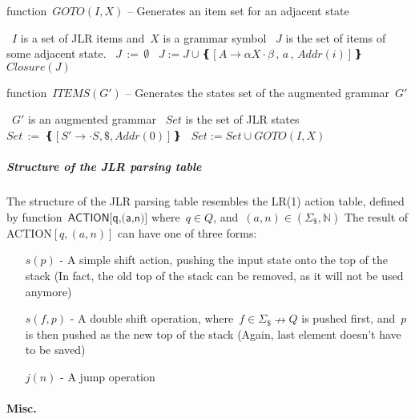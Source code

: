 \begin{algorithm}[p]
  \caption{\label{Algorithm:Goto}
  function~$GOTO(I,X)$ -- Generates an item set for an adjacent state}
  \begin{algorithmic}
    \REQUIRE~$I$ is a set of JLR items and~$X$ is a grammar symbol
    \ENSURE~$J$ is the set of items of some adjacent state.
    \STATE~$J \, := \,∅$
      \STATE~$ J := J∪❴ [ A→αX·β\, , \, a \, , \, Addr(i) ] ❵$
    \ENDFOR
    \RETURN~$Closure(J)$
  \end{algorithmic}
\end{algorithm}

\begin{algorithm}[p]
  \caption{\label{Algorithm:States}
  function~$ITEMS(G')$ -- Generates the states set of the augmented grammar~$G'$}
  \begin{algorithmic}
    \REQUIRE~$G'$ is an augmented grammar
    \ENSURE~$Set$ is the set of JLR states
    \STATE~$Set \, := \, ❴[S'→·S , \$ , Addr(0)]❵$
    \REPEAT
      \STATE~$ Set := Set ∪ GOTO(I,X)$
    \ENDIF
  \ENDFOR
      \ENDFOR
  \end{algorithmic}
\end{algorithm}

\subparagraph*{Structure of the JLR parsing table}
The structure of the JLR parsing table
  resembles the LR(1) action table,
  defined by function~$\textsf{ACTION[q,(a,n)]}$
  where~$q∈Q$, and~$(a,n)∈(Σ_\$,ℕ)$
The result of \textsf{ACTION}$[q,(a,n)]$ can have one of
  three forms:
\begin{itemize}
  \item[$s(p)$] - A simple shift action, pushing the input state onto the top of the stack
    (In fact, the old top of the stack can be removed, as it will not be used anymore)
  \item[$s(f,p)$] - A double shift operation, where~$f∈Σ_\$↛Q$ is pushed first, and~$p$ is then
    pushed as the new top of the stack (Again, last element doesn't have to be saved)
  \item[$j(n)$] - A jump operation
\end{itemize}
\paragraph{Misc.}

